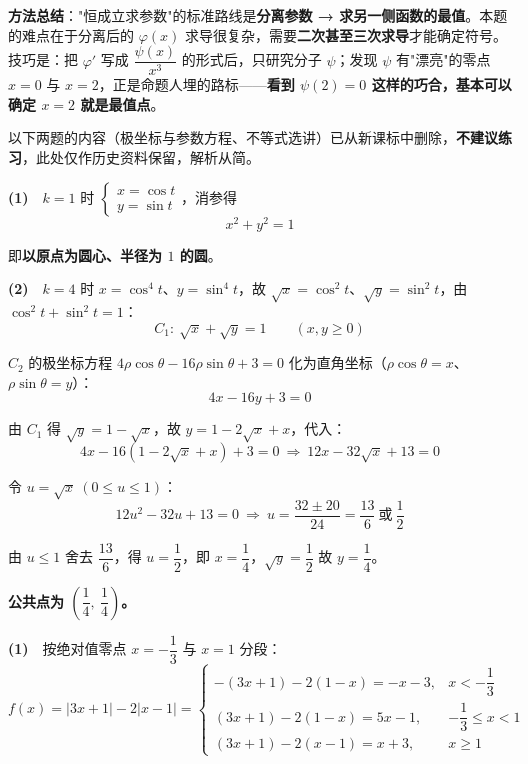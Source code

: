 \begin{gktip}
\textbf{方法总结}："恒成立求参数"的标准路线是\textbf{分离参数 → 求另一侧函数的最值}。本题的难点在于分离后的 $\varphi(x)$ 求导很复杂，需要\textbf{二次甚至三次求导}才能确定符号。技巧是：把 $\varphi'$ 写成 $\dfrac{\psi(x)}{x^{3}}$ 的形式后，只研究分子 $\psi$；发现 $\psi$ 有"漂亮"的零点 $x=0$ 与 $x=2$，正是命题人埋的路标——\textbf{看到 $\psi(2)=0$ 这样的巧合，基本可以确定 $x=2$ 就是最值点}。
\end{gktip}

\par\medskip


\begin{gktip}
以下两题的内容（极坐标与参数方程、不等式选讲）已从新课标中删除，\textbf{不建议练习}，此处仅作历史资料保留，解析从简。
\end{gktip}


\textbf{(1)}　$k=1$ 时 $\begin{cases}x=\cos t\\ y=\sin t\end{cases}$，消参得
\[x^{2}+y^{2}=1\]

即\textbf{以原点为圆心、半径为 $1$ 的圆}。

\textbf{(2)}　$k=4$ 时 $x=\cos^{4}t$、$y=\sin^{4}t$，故 $\sqrt x=\cos^{2}t$、$\sqrt y=\sin^{2}t$，由 $\cos^2t+\sin^2t=1$：
\[C_1:\ \sqrt x+\sqrt y=1\qquad(x,y\ge0)\]

$C_2$ 的极坐标方程 $4\rho\cos\theta-16\rho\sin\theta+3=0$ 化为直角坐标（$\rho\cos\theta=x$、$\rho\sin\theta=y$）：
\[4x-16y+3=0\]

由 $C_1$ 得 $\sqrt y=1-\sqrt x$，故 $y=1-2\sqrt x+x$，代入：
\[4x-16\left(1-2\sqrt x+x\right)+3=0\ \Longrightarrow\ 12x-32\sqrt x+13=0\]

令 $u=\sqrt x\ \left(0\le u\le1\right)$：
\[12u^{2}-32u+13=0\ \Longrightarrow\ u=\frac{32\pm20}{24}=\frac{13}6\ \text{或}\ \frac12\]

由 $u\le1$ 舍去 $\dfrac{13}6$，得 $u=\dfrac12$，即 $x=\dfrac14$，$\sqrt y=\dfrac12$ 故 $y=\dfrac14$。

\textbf{公共点为 $\left(\dfrac14,\ \dfrac14\right)$。}

\par\medskip


\textbf{(1)}　按绝对值零点 $x=-\dfrac13$ 与 $x=1$ 分段：
\[f(x)=|3x+1|-2|x-1|=\begin{cases}-(3x+1)-2(1-x)=-x-3,&x<-\dfrac13\\[2mm] (3x+1)-2(1-x)=5x-1,&-\dfrac13\le x<1\\[2mm] (3x+1)-2(x-1)=x+3,&x\ge1\end{cases}\]


